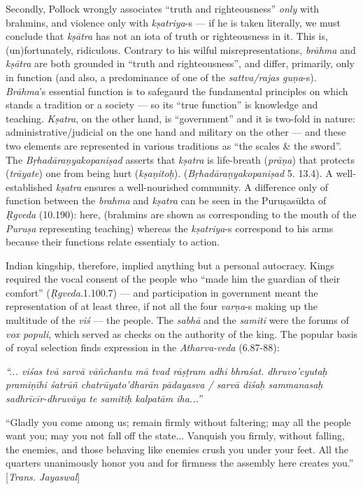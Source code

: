 Secondly, Pollock wrongly associates “truth and righteousness” {\sl only} with brahmins, and violence only with {\sl kṣatriya}-s --- if he is taken literally, we must conclude that {\sl kṣātra} has not an iota of truth or righteousness in it. This is, (un)fortunately, ridiculous. Contrary to his wilful misrepresentations, {\sl brāhma} and {\sl kṣātra} are both grounded in “truth and righteousness”, and differ, primarily, only in function (and also, a predominance of one of the {\sl sattva/rajas guṇa}-s). {\sl Brāhma}’s essential function is to safegaurd the fundamental principles on which stands a tradition or a society --- so its “true function” is knowledge and teaching. {\sl Kṣatra}, on the other hand, is “government” and it is two-fold in nature: administrative/judicial on the one hand and military on the other --- and these two elements are represented in various traditions as “the scales \& the sword”. The {\sl Bṛhadāraṇyakopaniṣad} asserts that {\sl kṣatra} is life-breath ({\sl prāṇa}) that protects ({\sl trāyate}) one from being hurt ({\sl kṣaṇitoḥ}). ({\sl Bṛhadāraṇyakopaniṣad} 5. 13.4).  A well-established {\sl kṣatra} ensures a well-nourished community. A difference only of function between the {\sl brahma} and {\sl kṣatra} can be seen in the Puruṣasūkta of {\sl Ṛgveda} (10.190): here, (brahmins are shown as corresponding to the mouth of the {\sl Puruṣa} representing teaching) whereas the {\sl kṣatriya}-s correspond to his arms because their functions relate essentialy to action. 

Indian kingship, therefore, implied anything but a personal autocracy. Kings required the vocal consent of the people who “made him the guardian of their comfort” ({\sl Ṛgveda}.1.100.7) --- and participation in government meant the representation of at least three, if not all the four {\sl varṇa}-s making up the multitude of the {\sl viś} --- the people. The {\sl sabhā} and the {\sl samiti} were the forums of {\sl vox populi}, which served as checks on the authority of the king. The popular basis of royal selection finds expression in the {\sl Atharva-veda} (6.87-88):

\begin{myquote}
{{\sl “... viśas tvā sarvā vāñchantu mā tvad rāṣṭram adhi bhraśat. dhruvo’cyutaḥ pramiṇīhi śatrūñ chatrūyato’dharān pādayasva / sarvā diśaḥ sammanasaḥ sadhrīcīr-dhruvāya te samitiḥ kalpatām iha...”}}

“Gladly you come among us; remain firmly without faltering; may all the people want you; may you not fall off the state... Vanquish you firmly, without falling, the enemies, and those behaving like enemies crush you under your feet. All the quarters unanimously honor you and for firmness the assembly here creates you.” [{\sl Trans. Jayaswal}]
\end{myquote}

